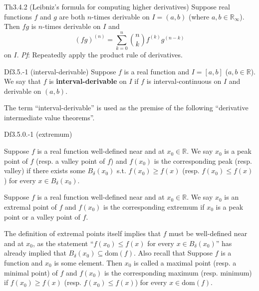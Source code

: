 \documentclass{article}
\begin{document}
\begin{Th}{Th3.4.2 (Leibniz's formula for computing higher derivatives)}
    Suppose real functions $f$ and $g$ are both $n$-times derivable on $I = (a,b)$ (where $a, b\in\mathbb{R}_\infty$). Then $fg$ is $n$-times derivable on $I$ and
    $$ (fg)^{(n)} = \sum_{k=0}^n \binom{n}{k} f^{(k)}g^{(n-k)}$$
    on $I$.
    \tcblower
    \textit{Pf}: Repeatedly apply the product rule of derivatives.
\end{Th}

\begin{Df}{Df3.5.-1 (interval-derivable)}
    Suppose $f$ is a real function and $I=[a,b]$ ($a,b\in\mathbb{R}$). We say that $f$ is \textbf{interval-derivable} on $I$ if $f$ is interval-continuous on $I$ and derivable on $(a,b)$.
\end{Df}

\begin{Rmk}{}
    The term ``interval-derivable'' is used as the premise of the following ``derivative intermediate value theorems''.
\end{Rmk}

\begin{Df}{Df3.5.0.-1 (extremum)}
    \begin{compactenum}
        \item Suppose $f$ is a real function well-defined near and at $x_0\in\mathbb{R}$. We say $x_0$ is a peak point of $f$ (resp. a valley point of $f$) and $f(x_0)$ is the corresponding peak (resp. valley) if there exists some $B_\delta(x_0)$ s.t. $f(x_0)\geq f(x)$ (resp. $f(x_0)\leq f(x)$) for every $x\in B_\delta(x_0)$.
        \item Suppose $f$ is a real function well-defined near and at $x_0\in\mathbb{R}$. We say $x_0$ is an extremal point of $f$ and $f(x_0)$ is the corresponding extremum if $x_0$ is a peak point or a valley point of $f$.
    \end{compactenum}
\end{Df}

\begin{Rmk}{}
    \textcolor{Th}{The definition of extremal points itself implies that $f$ must be well-defined near and at $x_0$,} as the statement ``$f(x_0)\leq f(x)$ for every $x\in B_\delta(x_0)$'' has already implied that $B_\delta(x_0)\subseteq\text{dom}(f)$. Also recall that \textcolor{Df}{Suppose $f$ is a function and $x_0$ is some element. Then $x_0$ is called a maximal point (resp. a minimal point) of $f$ and $f(x_0)$ is the corresponding maximum (resp. minimum) if $f(x_0)\geq f(x)$ (resp. $f(x_0)\leq f(x)$) for every $x\in \text{dom}(f)$.}
\end{Rmk}
\end{document}
